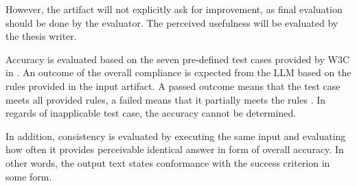 However, the artifact will not explicitly ask for improvement, as final evaluation should be done by the evaluator. The perceived usefulness will be evaluated by the thesis writer.

Accuracy is evaluated based on the seven pre-defined test cases provided by W3C in \textcite{act_rule_g88}. An outcome of the overall compliance is expected from the LLM based on the rules provided in the input artifact. A passed outcome means that the test case meets all provided rules, a failed means that it partially meets the rules \citep{act_rule_g88}. In regards of inapplicable test case, the accuracy cannot be determined. 

In addition, consistency is evaluated by executing the same input and evaluating how often it provides perceivable identical answer in form of overall accuracy. In other words, the output text states conformance with the success criterion in some form. 

